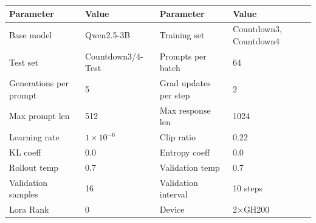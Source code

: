 \documentclass{article}
\theoremstyle{plain}
\theoremstyle{definition}
\theoremstyle{remark}
\begin{document}
\begin{table}[h]
  \centering
  \label{tab:config-countdown}
  \begin{tcolorbox}[
    enhanced, hbox,
    title={Training setup for Countdown},
    colback=teal!5, colframe=teal, coltext=black, coltitle=white,
    fonttitle=\bfseries, arc=1mm, boxrule=1pt, boxsep=1pt,
    left=2pt, right=2pt, top=0pt, bottom=2pt,
    toptitle=3pt, bottomtitle=3pt, center
  ]
    \small
    \renewcommand{\arraystretch}{1.2}
    \setlength{\tabcolsep}{8pt}
    \begin{tabular}{l|l|l|l}
      \textbf{Parameter} & \textbf{Value} & \textbf{Parameter} & \textbf{Value} \\
      \hline
      Base model & Qwen2.5-3B & Training set & Countdown3, Countdown4 \\
      Test set & Countdown3/4-Test & Prompts per batch & 64 \\
      Generations per prompt & 5 & Grad updates per step & 2 \\
      Max prompt len & 512 & Max response len & 1024 \\
      Learning rate & $1 \times 10^{-6}$ & Clip ratio & 0.22 \\
      KL coeff & 0.0 & Entropy coeff & 0.0 \\
      Rollout temp & 0.7 & Validation temp & 0.7 \\
      Validation samples & 16 & Validation interval & 10 steps \\
      Lora Rank & 0 & Device & 2$\times$GH200 \\
    \end{tabular}
  \end{tcolorbox}
\end{table}
\end{document}
